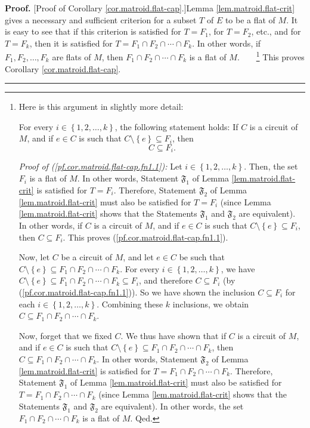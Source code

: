 \documentclass[numbers=enddot,12pt,final,onecolumn,notitlepage]{scrartcl}%
\theoremstyle{definition}
\newenvironment{proof}[1][Proof]{\noindent\textbf{#1.} }{\ \rule{0.5em}{0.5em}}
\begin{document}
\begin{proof}
[Proof of Corollary \ref{cor.matroid.flat-cap}.]Lemma
\ref{lem.matroid.flat-crit} gives a necessary and sufficient criterion for a
subset $T$ of $E$ to be a flat of $M$. It is easy to see that if this
criterion is satisfied for $T=F_{1}$, for $T=F_{2}$, etc., and for $T=F_{k}$,
then it is satisfied for $T=F_{1}\cap F_{2}\cap\cdots\cap F_{k}$. In other
words, if $F_{1},F_{2},\ldots,F_{k}$ are flats of $M$, then $F_{1}\cap
F_{2}\cap\cdots\cap F_{k}$ is a flat of $M$.\ \ \ \ \footnote{Here is this
argument in slightly more detail:
\par
For every $i\in\left\{  1,2,\ldots,k\right\}  $, the following statement
holds: If $C$ is a circuit of $M$, and if $e\in C$ is such that $C\setminus
\left\{  e\right\}  \subseteq F_{i}$, then%
\begin{equation}
C\subseteq F_{i}. \label{pf.cor.matroid.flat-cap.fn1.1}%
\end{equation}
\par
\textit{Proof of (\ref{pf.cor.matroid.flat-cap.fn1.1}):} Let $i\in\left\{
1,2,\ldots,k\right\}  $. Then, the set $F_{i}$ is a flat of $M$. In other
words, Statement $\mathfrak{F}_{1}$ of Lemma \ref{lem.matroid.flat-crit} is
satisfied for $T=F_{i}$. Therefore, Statement $\mathfrak{F}_{2}$ of Lemma
\ref{lem.matroid.flat-crit} must also be satisfied for $T=F_{i}$ (since Lemma
\ref{lem.matroid.flat-crit} shows that the Statements $\mathfrak{F}_{1}$ and
$\mathfrak{F}_{2}$ are equivalent). In other words, if $C$ is a circuit of
$M$, and if $e\in C$ is such that $C\setminus\left\{  e\right\}  \subseteq
F_{i}$, then $C\subseteq F_{i}$. This proves
(\ref{pf.cor.matroid.flat-cap.fn1.1}).
\par
Now, let $C$ be a circuit of $M$, and let $e\in C$ be such that $C\setminus
\left\{  e\right\}  \subseteq F_{1}\cap F_{2}\cap\cdots\cap F_{k}$. For every
$i\in\left\{  1,2,\ldots,k\right\}  $, we have $C\setminus\left\{  e\right\}
\subseteq F_{1}\cap F_{2}\cap\cdots\cap F_{k}\subseteq F_{i}$, and therefore
$C\subseteq F_{i}$ (by (\ref{pf.cor.matroid.flat-cap.fn1.1})). So we have
shown the inclusion $C\subseteq F_{i}$ for each $i\in\left\{  1,2,\ldots
,k\right\}  $. Combining these $k$ inclusions, we obtain $C\subseteq F_{1}\cap
F_{2}\cap\cdots\cap F_{k}$.
\par
Now, forget that we fixed $C$. We thus have shown that if $C$ is a circuit of
$M$, and if $e\in C$ is such that $C\setminus\left\{  e\right\}  \subseteq
F_{1}\cap F_{2}\cap\cdots\cap F_{k}$, then $C\subseteq F_{1}\cap F_{2}%
\cap\cdots\cap F_{k}$. In other words, Statement $\mathfrak{F}_{2}$ of Lemma
\ref{lem.matroid.flat-crit} is satisfied for $T=F_{1}\cap F_{2}\cap\cdots\cap
F_{k}$. Therefore, Statement $\mathfrak{F}_{1}$ of Lemma
\ref{lem.matroid.flat-crit} must also be satisfied for $T=F_{1}\cap F_{2}%
\cap\cdots\cap F_{k}$ (since Lemma \ref{lem.matroid.flat-crit} shows that the
Statements $\mathfrak{F}_{1}$ and $\mathfrak{F}_{2}$ are equivalent). In other
words, the set $F_{1}\cap F_{2}\cap\cdots\cap F_{k}$ is a flat of $M$. Qed.}
This proves Corollary \ref{cor.matroid.flat-cap}.
\end{proof}
\end{document}
